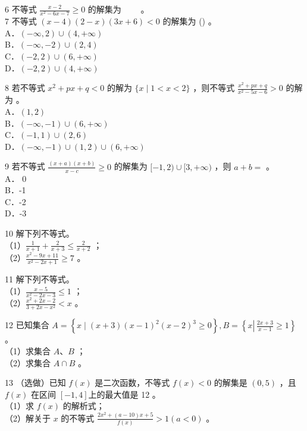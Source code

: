 \documentclass[10pt]{article}
\begin{document}
6 不等式 \(\frac{x-2}{x^{2}-6 x-7} \geqslant 0\) 的解集为 \(\qquad\)。\\
7 不等式 \((x-4)(2-x)(3 x+6)<0\) 的解集为 () 。\\
A．\((-\infty, 2) \cup(4,+\infty)\)\\
B．\((-\infty,-2) \cup(2,4)\)\\
C．\((-2,2) \cup(6,+\infty)\)\\
D．\((-2,2) \cup(4,+\infty)\)

8 若不等式 \(x^{2}+p x+q<0\) 的解为 \(\{x \mid 1<x<2\}\) ，则不等式 \(\frac{x^{2}+p x+q}{x^{2}-5 x-6}>0\) 的解为 。\\
A．\((1,2)\)\\
B．\((-\infty,-1) \cup(6,+\infty)\)\\
C．\((-1,1) \cup(2,6)\)\\
D．\((-\infty,-1) \cup(1,2) \cup(6,+\infty)\)

9 若不等式 \(\frac{(x+a)(x+b)}{x-c} \geqslant 0\) 的解集为 \([-1,2) \cup[3,+\infty)\) ，则 \(a+b=\) 。\\
A． 0\\
B．-1\\
C．-2\\
D．-3

10 解下列不等式。\\
（1）\(\frac{1}{x+1}+\frac{2}{x+3} \leqslant \frac{2}{x+2}\) ；\\
（2）\(\frac{x^{2}-9 x+11}{x^{2}-2 x+1} \geqslant 7\) 。

11 解下列不等式。\\
（1）\(\frac{x-5}{x^{2}-2 x-3} \leqslant 1\) ；\\
（2）\(\frac{x^{2}+2 x-2}{3+2 x-x^{2}}<x\) 。

12 已知集合 \(A=\left\{x \mid(x+3)(x-1)^{2}(x-2)^{3} \geqslant 0\right\}, B=\left\{x \left\lvert\, \frac{2 x+3}{x-1} \geqslant 1\right.\right\}\) 。\\
（1）求集合 \(A 、 B\) ；\\
（2）求集合 \(A \cap B\) 。

13 （选做）已知 \(f(x)\) 是二次函数，不等式 \(f(x)<0\) 的解集是 \((0,5)\) ，且 \(f(x)\) 在区间 \([-1,4]\)上的最大值是 12 。\\
（1）求 \(f(x)\) 的解析式；\\
（2）解关于 \(x\) 的不等式 \(\frac{2 x^{2}+(a-10) x+5}{f(x)}>1(a<0)\) 。
\end{document}
